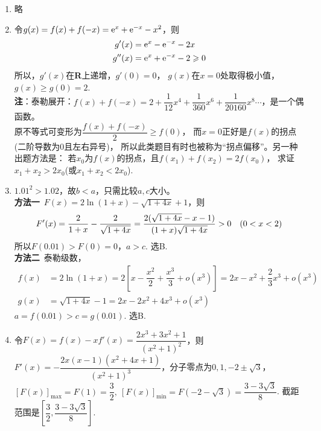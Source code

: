 \begin{enumerate}[label={\textbf{\thechapter.\arabic*}},leftmargin=
    \inteval{\myenumleftmargin}pt]
\item 
略

\item 令$ g(x)=f(x)+f(-x)=\mathrm{e}^x+\mathrm{e}^{-x}-x^2 $，则
\begin{align*}
    g'(x) &=\mathrm{e}^x-\mathrm{e}^{-x}-2x \\
    g''(x) &=\mathrm{e}^x+\mathrm{e}^{-x}-2\geqslant 0 
\end{align*}
所以，$ g'(x) $在\textbf{R}上递增，$ g'(0)=0 $，
$ g(x) $在$ x=0 $处取得极小值，$ g(x)\geq g(0)=2 $. \\
\textbf{注}：泰勒展开：$ f(x)+f(-x)=2+\dfrac{1}{12}x^4+\dfrac{1}{360}x^6+
\dfrac{1}{20160}x^8\cdots $，是一个偶函数。\\
原不等式可变形为$ \dfrac{f(x)+f(-x)}{2}\geq f(0) $，
而$ x=0 $正好是$ f(x) $的拐点(二阶导数为0且左右异号)，
所以此类题目有时也被称为“拐点偏移”。另一种出题方法是：
若$ x_0 $为$ f(x) $的拐点，且$ f(x_1)+f(x_2)=2f(x_0) $，
求证$ x_1+x_2>2x_0 $(或$ x_1+x_2< 2x_0 $).

\item $1.01^{2}>1.02$，故$b<a$，只需比较$ a,c $大小。\\
\textbf{方法一}\ $ F(x)=2\ln(1+x)-\sqrt{1+4x}+1 $，则
\begin{gather*}
    F'(x)=\dfrac{2}{1+x}-\dfrac{2}{\sqrt{1+4x}}=
    \dfrac{2(\sqrt{1+4x}-x-1)}{(1+x)\sqrt{1+4x}}>0 \quad (0<x<2)
\end{gather*}
所以$ F(0.01)>F(0)=0 $，$ a>c $. 选B. \\
\textbf{方法二}\ 泰勒级数，
\begin{align*}
    f(x) &=2\ln(1+x)=2\left[x-\dfrac{x^{2}}{2}+\dfrac{x^3}{3}+
    o\left(x^{3}\right) \right]=2x-x^2+\dfrac{2}{3}x^3+o(x^3) \\
    g(x) &=\sqrt{1+4x}-1=2x-2x^2+4x^3+o(x^3)
\end{align*}
$ a=f(0.01)>c=g(0.01) $. 选B.

\item 
令$ F(x)=f(x)-xf'(x)=\dfrac{2x^3+3x^2+1}{(x^2+1)^2} $，则
$ F'(x)=-\dfrac{2x(x-1)(x^2+4x+1)}{(x^2+1)^3} $，分子零点为$ 0, 1,
-2\pm \sqrt{3} $，$ [F(x)]_{\max}=F(1)=\dfrac{3}{2},\ 
[F(x)]_{\min}=F(-2-\sqrt{3})=\dfrac{3-3\sqrt{3}}{8} $.
截距范围是$ \left[\dfrac{3}{2},\dfrac{3-3\sqrt{3}}{8}\right] $.


\end{enumerate}
